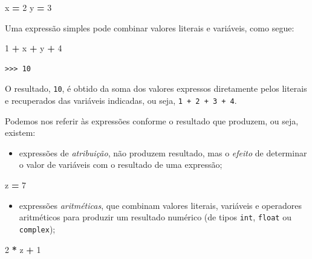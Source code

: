 \documentclass[
]{book}
\newenvironment{Shaded}{\begin{snugshade}}{\end{snugshade}}
\newcommand{\DecValTok}[1]{\textcolor[rgb]{0.00,0.00,0.81}{#1}}
\newcommand{\NormalTok}[1]{#1}
\newcommand{\OperatorTok}[1]{\textcolor[rgb]{0.81,0.36,0.00}{\textbf{#1}}}
\providecommand{\tightlist}{%
  \setlength{\itemsep}{0pt}\setlength{\parskip}{0pt}}
\begin{document}
\begin{Shaded}
\begin{Highlighting}[]
\NormalTok{x }\OperatorTok{=} \DecValTok{2}
\NormalTok{y }\OperatorTok{=} \DecValTok{3}
\end{Highlighting}
\end{Shaded}

Uma expressão simples pode combinar valores literais e variáveis, como segue:

\begin{Shaded}
\begin{Highlighting}[]
\DecValTok{1} \OperatorTok{+}\NormalTok{ x }\OperatorTok{+}\NormalTok{ y }\OperatorTok{+} \DecValTok{4}
\end{Highlighting}
\end{Shaded}

\begin{verbatim}
>>> 10
\end{verbatim}

O resultado, \texttt{10}, é obtido da soma dos valores expressos diretamente pelos literais e recuperados das variáveis indicadas, ou seja, \texttt{1\ +\ 2\ +\ 3\ +\ 4}.

Podemos nos referir às expressões conforme o resultado que produzem, ou seja, existem:

\begin{itemize}
\tightlist
\item
  expressões de \emph{atribuição}, não produzem resultado, mas o \emph{efeito} de determinar o valor de variáveis com o resultado de uma expressão;
\end{itemize}

\begin{Shaded}
\begin{Highlighting}[]
\NormalTok{z }\OperatorTok{=} \DecValTok{7}
\end{Highlighting}
\end{Shaded}

\begin{itemize}
\tightlist
\item
  expressões \emph{aritméticas}, que combinam valores literais, variáveis e operadores aritméticos para produzir um resultado numérico (de tipos \texttt{int}, \texttt{float} ou \texttt{complex});
\end{itemize}

\begin{Shaded}
\begin{Highlighting}[]
\DecValTok{2} \OperatorTok{*}\NormalTok{ z }\OperatorTok{+} \DecValTok{1}
\end{Highlighting}
\end{Shaded}
\end{document}
